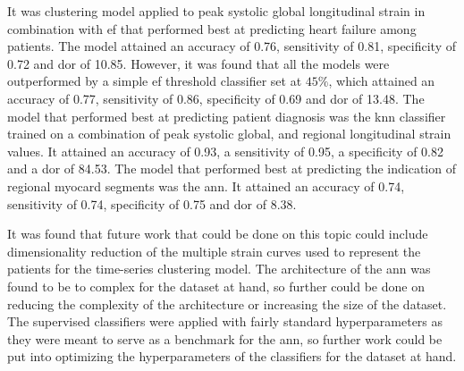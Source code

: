 It was clustering model applied to peak systolic global longitudinal strain in combination with \acrshort{ef} that performed best at predicting heart failure among patients. The model attained an accuracy of 0.76, sensitivity of 0.81, specificity of 0.72 and \acrshort{dor} of 10.85. However, it was found that all the models were outperformed by a simple \acrshort{ef} threshold classifier set at $45\%$, which attained an accuracy of 0.77, sensitivity of 0.86, specificity of 0.69 and \acrshort{dor} of 13.48. The model that performed best at predicting patient diagnosis was the \acrlong{knn} classifier trained on a combination of peak systolic global, and regional longitudinal strain values. It attained an accuracy of 0.93, a sensitivity of 0.95, a specificity of 0.82 and a \acrshort{dor} of 84.53. The model that performed best at predicting the indication of regional myocard segments was the \acrshort{ann}. It attained an accuracy of 0.74, sensitivity of 0.74, specificity of 0.75 and \acrshort{dor} of 8.38. \bigskip

It was found that future work that could be done on this topic could include dimensionality reduction of the multiple strain curves used to represent the patients for the time-series clustering model. The architecture of the \acrshort{ann} was found to be to complex for the dataset at hand, so further could be done on reducing the complexity of the architecture or increasing the size of the dataset. The supervised classifiers were applied with fairly standard hyperparameters as they were meant to serve as a benchmark for the \acrshort{ann}, so further work could be put into optimizing the hyperparameters of the classifiers for the dataset at hand.

\clearpage
